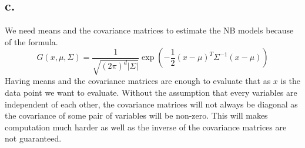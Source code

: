 \documentclass[11pt]{article}
\theoremstyle{mystyle}
\theoremstyle{definition}
\begin{document}
\subsection*{c.}
We need means and the covariance matrices to estimate the NB models because of the formula. 
\[
  G(x, \mu, \Sigma) = \displaystyle\frac{1}{\sqrt{(2\pi)^d |\Sigma|}} \exp\left( -\displaystyle\frac{1}{2} (x-\mu)^T \Sigma^{-1} (x-\mu) \right)
\]
Having means and the covariance matrices are enough to evaluate that as $x$ is the data point we want to evaluate. Without the assumption that every variables are independent of each other, the covariance matrices will not always be diagonal as the covariance of some pair of variables will be non-zero. This will makes computation much harder as well as the inverse of the covariance matrices are not guaranteed. 
\end{document}
